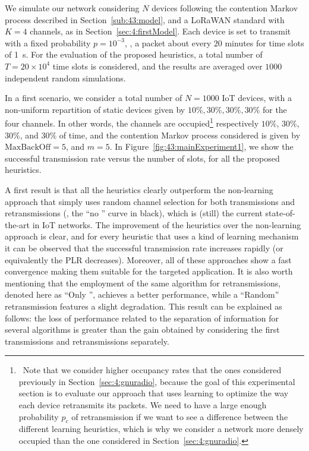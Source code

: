We simulate our network considering $N$ devices following the contention Markov process described in Section~\ref{sub:43:model}, and a LoRaWAN standard with $K=4$ channels, as in Section~\ref{sec:4:firstModel}.
Each device is set to transmit with a fixed probability $p=10^{-3}$, \ie, a packet about every $20$ minutes for time slots of \SI{1}{\second}.
%
For the evaluation of the proposed heuristics, a total number of $T=20 \times 10^4$ time slots is considered, and the results are averaged over $1000$ independent random simulations.

In a first scenario, we consider a total number of $N=1000$ IoT devices, with a non-uniform repartition of static devices given by $10\%,30\%,30\%,30\%$ for the four channels.
In other words, the channels are occupied\footnote{~Note that we consider higher occupancy rates that the ones considered previously in Section~\ref{sec:4:gnuradio}, because the goal of this experimental section is to evaluate our approach that uses learning to optimize the way each device retransmits its packets. We need to have a large enough probability $p_c$ of retransmission if we want to see a difference between the different learning heuristics, which is why we consider a network more densely occupied than the one considered in Section~\ref{sec:4:gnuradio}.}
respectively $10\%$, $30\%$, $30\%$, and $30\%$ of time, and the contention Markov process considered is given by $\mathrm{MaxBackOff} = 5$, and $m=5$.
In Figure~\ref{fig:43:mainExperiment1}, we show the successful transmission rate versus the number of slots, for all the proposed heuristics.

A first result is that all the heuristics clearly outperform the non-learning approach that simply uses random channel selection for both transmissions and retransmissions (\ie, the ``no \UCB{}'' curve in black), which is (still) the current state-of-the-art in IoT networks.
The improvement of the heuristics over the non-learning approach is clear, and for every heuristic that uses a kind of learning mechanism it can be observed that the successful transmission rate increases rapidly (or equivalently the PLR decreases).
Moreover, all of these approaches show a fast convergence making them suitable for the targeted application.
It is also worth mentioning that the employment of the same \UCB{} algorithm for retransmissions, denoted here as ``Only \UCB{}'', achieves a better performance, while a ``Random'' retransmission features a slight degradation. This result can be explained as follows: the loss of performance related to the separation of information for several algorithms is greater than the gain obtained by considering the first transmissions and retransmissions separately.

